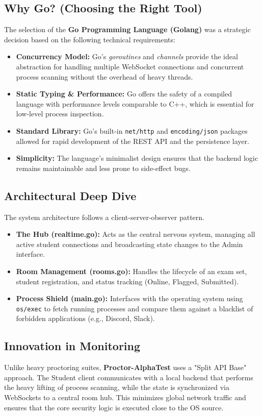\documentclass[12pt,a4paper]{article}
\begin{document}
\subsection{Why Go? (Choosing the Right Tool)}
The selection of the \textbf{Go Programming Language (Golang)} was a strategic decision based on the following technical requirements:
\begin{itemize}
    \item \textbf{Concurrency Model:} Go's \textit{goroutines} and \textit{channels} provide the ideal abstraction for handling multiple WebSocket connections and concurrent process scanning without the overhead of heavy threads.
    \item \textbf{Static Typing \& Performance:} Go offers the safety of a compiled language with performance levels comparable to C++, which is essential for low-level process inspection.
    \item \textbf{Standard Library:} Go's built-in \texttt{net/http} and \texttt{encoding/json} packages allowed for rapid development of the REST API and the persistence layer.
    \item \textbf{Simplicity:} The language's minimalist design ensures that the backend logic remains maintainable and less prone to side-effect bugs.
\end{itemize}

\subsection{Architectural Deep Dive}
The system architecture follows a client-server-observer pattern. 
\begin{itemize}
    \item \textbf{The Hub (realtime.go):} Acts as the central nervous system, managing all active student connections and broadcasting state changes to the Admin interface.
    \item \textbf{Room Management (rooms.go):} Handles the lifecycle of an exam set, student registration, and status tracking (Online, Flagged, Submitted).
    \item \textbf{Process Shield (main.go):} Interfaces with the operating system using \texttt{os/exec} to fetch running processes and compare them against a blacklist of forbidden applications (e.g., Discord, Slack).
\end{itemize}

\subsection{Innovation in Monitoring}
Unlike heavy proctoring suites, \textbf{Proctor-AlphaTest} uses a "Split API Base" approach. The Student client communicates with a local backend that performs the heavy lifting of process scanning, while the state is synchronized via WebSockets to a central room hub. This minimizes global network traffic and ensures that the core security logic is executed close to the OS source.
\end{document}
